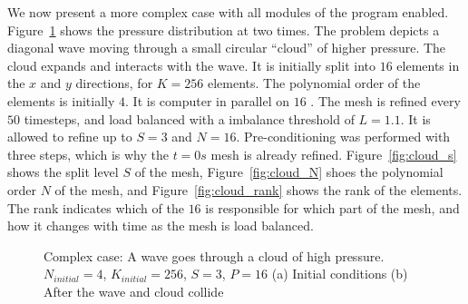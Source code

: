 We now present a more complex case with all modules of the program enabled. Figure~\ref{fig:cloud_p}
shows the pressure distribution at two times. The problem depicts a diagonal wave moving through a
small circular ``cloud'' of higher pressure. The cloud expands and interacts with the wave. It is
initially split into \(16\) elements in the \(x\) and \(y\) directions, for \(K = 256\) elements.
The polynomial order of the elements is initially \(4\). It is computer in parallel on \(16\)
. The mesh is refined every \(50\) timesteps, and load balanced with a imbalance
threshold of \(L = 1.1\). It is allowed to refine up to \(S = 3\) and \(N = 16\). Pre-conditioning
was performed with three steps, which is why the \(t = 0 s\) mesh is already refined.
Figure~\ref{fig:cloud_s} shows the split level \(S\) of the mesh, Figure~\ref{fig:cloud_N} shoes the
polynomial order \(N\) of the mesh, and Figure~\ref{fig:cloud_rank} shows the rank of the elements.
The rank indicates which of the \(16\)  is responsible for which part of the
mesh, and how it changes with time as the mesh is load balanced.

\begin{figure}[H]
	\centering
	\hfill
	\caption{Complex case: A wave goes through a cloud of high pressure. \(N_{initial} = 4\), \(K_{initial} = 256\), \(S = 3\), \(P = 16\) (a) Initial conditions (b) After the wave and cloud collide}\label{fig:cloud_p}
\end{figure}

